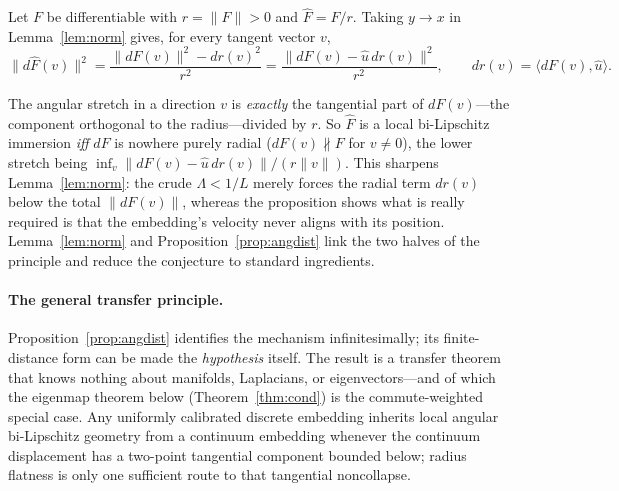 \documentclass[review]{siamart220329}
\begin{document}
\begin{proposition}\label{prop:angdist}
Let $F$ be differentiable with $r=\lVert F\rVert>0$ and $\hat F=F/r$. Taking
$y\to x$ in Lemma~\ref{lem:norm} gives, for every tangent vector $v$,
\[
\lVert d\hat F(v)\rVert^2=\frac{\lVert dF(v)\rVert^2-dr(v)^2}{r^2}
=\frac{\lVert dF(v)-\hat u\,dr(v)\rVert^2}{r^2},
\qquad dr(v)=\langle dF(v),\hat u\rangle .
\]
\end{proposition}

The angular stretch in a direction $v$ is \emph{exactly} the tangential part
of $dF(v)$---the component orthogonal to the radius---divided by $r$. So $\hat F$
is a local bi-Lipschitz immersion \emph{iff} $dF$ is nowhere purely radial
($dF(v)\not\parallel F$ for $v\neq0$), the lower stretch being
$\inf_{v}\lVert dF(v)-\hat u\,dr(v)\rVert/(r\lVert v\rVert)$. This sharpens
Lemma~\ref{lem:norm}: the crude $\Lambda<1/L$ merely forces the radial term
$dr(v)$ below the total $\lVert dF(v)\rVert$, whereas the proposition shows what is
really required is that the embedding's velocity never aligns with its position.
Lemma~\ref{lem:norm} and Proposition~\ref{prop:angdist} link the two halves of the
principle and reduce the conjecture to standard ingredients.

\paragraph{The general transfer principle.}
Proposition~\ref{prop:angdist} identifies the mechanism infinitesimally; its
finite-distance form can be made the \emph{hypothesis} itself. The result is a
transfer theorem that knows nothing about manifolds, Laplacians, or
eigenvectors---and of which the eigenmap theorem below
(Theorem~\ref{thm:cond}) is the commute-weighted special case. Any uniformly
calibrated discrete embedding inherits local angular bi-Lipschitz geometry
from a continuum embedding whenever the continuum displacement has a two-point
tangential component bounded below; radius flatness is only one sufficient
route to that tangential noncollapse.
\end{document}
